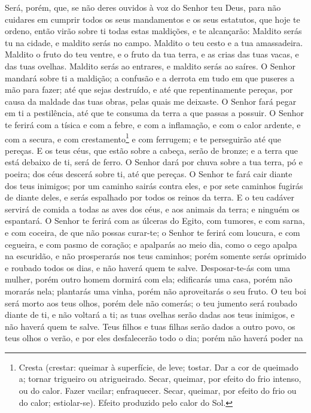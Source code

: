 Será, porém, que, se não deres ouvidos à voz do Senhor teu Deus,
para não cuidares em cumprir todos os seus mandamentos e os seus
estatutos, que hoje te ordeno, então virão sobre ti todas estas
maldições, e te alcançarão: Maldito serás tu na cidade, e
maldito serás no campo. Maldito o teu cesto e a tua
amassadeira. Maldito o fruto do teu ventre, e o fruto da tua
terra, e as crias das tuas vacas, e das tuas ovelhas. Maldito
serás ao entrares, e maldito serás ao saíres. O Senhor
mandará sobre ti a maldição; a confusão e a derrota em tudo em que
puseres a mão para fazer; até que sejas destruído, e até que
repentinamente pereças, por causa da maldade das tuas obras, pelas
quais me deixaste. O Senhor fará pegar em ti a pestilência,
até que te consuma da terra a que passas a possuir. O Senhor
te ferirá com a tísica e com a febre, e com a inflamação, e com o
calor ardente, e com a secura, e com crestamento\footnote{Cresta
(crestar: queimar à superfície, de leve; tostar. Dar a cor de
queimado a; tornar trigueiro ou atrigueirado. Secar, queimar, por
efeito do frio intenso, ou do calor. Fazer vacilar; enfraquecer.
Secar, queimar, por efeito do frio ou do calor; estiolar-se). Efeito
produzido pelo calor do Sol.} e com ferrugem; e te perseguirão até
que pereças. E os teus céus, que estão sobre a cabeça, serão
de bronze; e a terra que está debaixo de ti, será de ferro. O
Senhor dará por chuva sobre a tua terra, pó e poeira; dos céus
descerá sobre ti, até que pereças. O Senhor te fará cair
diante dos teus inimigos; por um caminho sairás contra eles, e por
sete caminhos fugirás de diante deles, e serás espalhado por todos
os reinos da terra. E o teu cadáver servirá de comida a todas
as aves dos céus, e aos animais da terra; e ninguém os espantará.
O Senhor te ferirá com as úlceras do Egito, com tumores, e
com sarna, e com coceira, de que não possas curar-te; o
Senhor te ferirá com loucura, e com cegueira, e com pasmo de
coração; e apalparás ao meio dia, como o cego apalpa na
escuridão, e não prosperarás nos teus caminhos; porém somente serás
oprimido e roubado todos os dias, e não haverá quem te salve.
Desposar-te-ás com uma mulher, porém outro homem dormirá com
ela; edificarás uma casa, porém não morarás nela; plantarás uma
vinha, porém não aproveitarás o seu fruto. O teu boi será
morto aos teus olhos, porém dele não comerás; o teu jumento será
roubado diante de ti, e não voltará a ti; as tuas ovelhas serão
dadas aos teus inimigos, e não haverá quem te salve. Teus
filhos e tuas filhas serão dados a outro povo, os teus olhos o
verão, e por eles desfalecerão todo o dia; porém não haverá poder na

